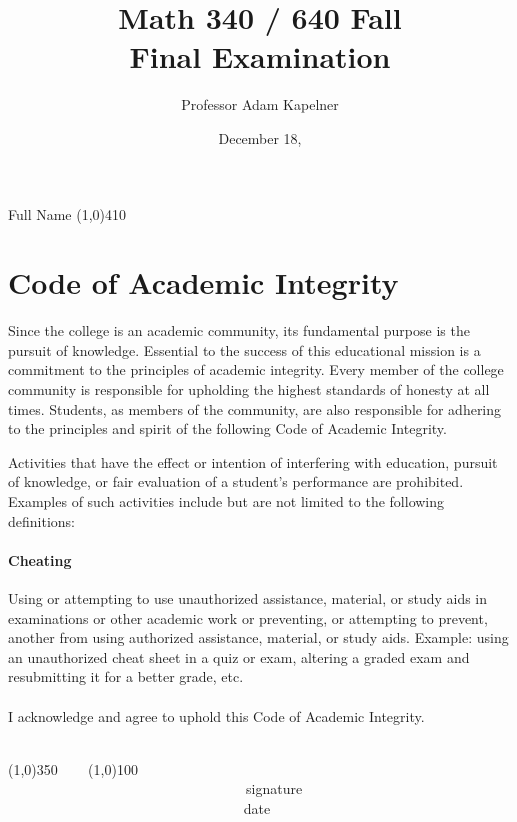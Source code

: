 \documentclass[12pt]{article}
\title{Math 340 / 640 Fall \the\year{} \\ Final Examination \inred{Solutions}}
\author{Professor Adam Kapelner}
\date{December 18, \the\year{}}
\begin{document}
\maketitle

\noindent Full Name \line(1,0){410}

\thispagestyle{empty}

\section*{Code of Academic Integrity}

\footnotesize
Since the college is an academic community, its fundamental purpose is the pursuit of knowledge. Essential to the success of this educational mission is a commitment to the principles of academic integrity. Every member of the college community is responsible for upholding the highest standards of honesty at all times. Students, as members of the community, are also responsible for adhering to the principles and spirit of the following Code of Academic Integrity.

Activities that have the effect or intention of interfering with education, pursuit of knowledge, or fair evaluation of a student's performance are prohibited. Examples of such activities include but are not limited to the following definitions:

\paragraph{Cheating} Using or attempting to use unauthorized assistance, material, or study aids in examinations or other academic work or preventing, or attempting to prevent, another from using authorized assistance, material, or study aids. Example: using an unauthorized cheat sheet in a quiz or exam, altering a graded exam and resubmitting it for a better grade, etc.\\
\\
\noindent I acknowledge and agree to uphold this Code of Academic Integrity. \\~\\

\begin{center}
\line(1,0){350} ~~~ \line(1,0){100}\\
~~~~~~~~~~~~~~~~~~~~~~~~~~~~~~~~~~signature~~~~~~~~~~~~~~~~~~~~~~~~~~~~~~~~~~~~~~~~~~~~~~~~~~~~~~~~~~~~~~ date
\end{center}

\normalsize
\end{document}
